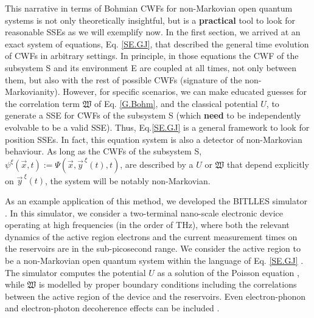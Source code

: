 \documentclass[11pt, a4paper]{article} %
\begin{document}
This narrative in terms of Bohmian CWFs for non-Markovian open quantum systems is not only theoretically insightful, but is a {\bf practical} tool to look for reasonable SSEs as we will exemplify now. In the first section, we arrived at an exact system of equations, Eq. \eqref{SE.GJ}, that described the general time evolution of CWFs in arbitrary settings. In principle, in those equations the CWF of the subsystem S and its environment E are coupled at all times, not only between them, but also with the rest of possible CWFs (signature of the non-Markovianity). However, for specific scenarios, we can make educated guesses for the correlation term $\mathfrak{W}$ of Eq. \eqref{G.Bohm}, and the classical potential $U$, to generate a SSE for CWFs of the subsystem S (which {\bf need} to be independently evolvable to be a valid SSE). Thus, Eq.\eqref{SE.GJ} is a general framework to look for position SSEs. In fact, this equation system is also a detector of non-Markovian behaviour. As long as the CWFs of the subsystem S, $\psi^\xi(\vec{x},t):=\Psi(\vec{x},\vec{y}^{\:\xi}(t),t)$, are described by a $U$ or $\mathfrak{W}$ that depend explicitly on $\vec{y}^{\:\xi}(t)$, the system will be notably non-Markovian.

As an example application of this method, we developed the BITLLES simulator \cite{tdp,Pois,Thz}. In this simulator, we consider a two-terminal nano-scale electronic device operating at high frequencies (in the order of THz), where both the relevant dynamics of the active region electrons and the current measurement times on the reservoirs are in the sub-picosecond range. We consider the active region to be a non-Markovian open quantum system within the language of Eq. \eqref{SE.GJ} \cite{Thz}. The simulator computes the potential $U$ as a solution of the Poisson equation \cite{Pois}, while $\mathfrak{W}$ is modelled by proper boundary conditions \cite{boundary1, Pois} including the correlations between the active region of the device and the reservoirs. Even electron-phonon and electron-photon decoherence effects can be included \cite{eph, Matteo}.\vspace{-0.1cm}
\end{document}
